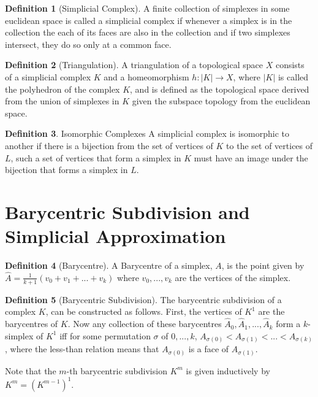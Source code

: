 \documentclass{article}
\theoremstyle{definition}
\newtheorem{definition}{Definition}[section]
\theoremstyle{remark}
\theoremstyle{remark}
\begin{document}
\begin{definition}[Simplicial Complex]
    A finite collection of simplexes in some euclidean space is called a simplicial complex if whenever a simplex is in the collection the each of its faces are also in the collection and if two simplexes intersect, they do so only at a common face. 
\end{definition}

\begin{definition}[Triangulation]
    A triangulation of a topological space $X$ consists of a simplicial complex $K$ and a homeomorphism $h: |K| \to X$, where $|K|$ is called the polyhedron of the complex $K$, and is defined as the topological space derived from the union of simplexes in $K$ given the subspace topology from the euclidean space.
\end{definition}

\begin{definition}{Isomorphic Complexes}
    A simplicial complex is isomorphic to another if there is a bijection from the set of vertices of $K$ to the set of vertices of $L$, such a set of vertices that form a simplex in $K$ must have an image under the bijection that forms a simplex in $L$. 
\end{definition}

\section{Barycentric Subdivision and Simplicial Approximation}

\begin{definition}[Barycentre]
    A Barycentre of a simplex, $A$, is the point given by $\hat{A} = \frac{1}{k+1}(v_0 + v_1 + ... + v_k)$ where $v_0, ..., v_k$ are the vertices of the simplex.
\end{definition}

\begin{definition}[Barycentric Subdivision]
    The barycentric subdivision of a complex $K$, can be constructed as follows. First, the vertices of $K^1$ are the barycentres of $K$. Now any collection of these barycentres $\hat{A}_0, \hat{A}_1, ..., \hat{A}_k$ form a $k$-simplex of $K^1$ iff for some permutation $\sigma$ of $0, ..., k$, $A_{\sigma(0)} < A_{\sigma(1)} < ... < A_{\sigma(k)}$, where the less-than relation means that $A_{\sigma(0)}$ is a face of $A_{\sigma(1)}$. 
    
    Note that the $m$-th barycentric subdivision $K^m$ is given inductively by $K^m = (K^{m-1})^1$.
\end{definition}
\end{document}
